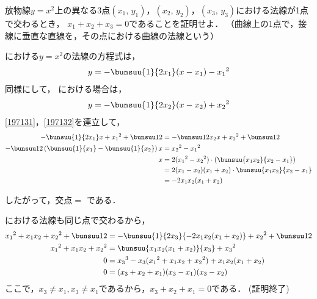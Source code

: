 \begin{problem}
  放物線$y=x^2$上の異なる3点$(x_1, \, y_1)$，$(x_2, \, y_2)$，$(x_3, \, y_3)$における法線が1点で交わるとき，
$x_1+x_2+x_3=0$であることを証明せよ．
（曲線上の1点で，接線に垂直な直線を，その点における曲線の法線という）
\end{problem}

 における$y=x^2$の法線の方程式は，
\begin{align}
  y = -\bunsuu{1}{2x_1}(x-x_1) - {x_1}^2 \label{197131}
\end{align}
同様にして， における場合は，
\begin{align}
  y = -\bunsuu{1}{2x_2}(x-x_2) + {x_2}^2 \label{197132}
\end{align}
\eqref{197131}，\eqref{197132}を連立して，
\begin{align*}
  -\bunsuu{1}{2x_1}x + {x_1}^2 + \bunsuu12 &= -\bunsuu1{2x_2}x + {x_2}^2 + \bunsuu12\\
  -\bunsuu12\left(\bunsuu{1}{x_1} - \bunsuu{1}{x_2}\right)x &= {x_2}^2 - {x_1}^2\\
  x&=2({x_1}^2-{x_2}^2) \cdot \left(\bunsuu{x_1x_2}{x_2-x_1}\right)\\
  &=2(x_1-x_2)(x_1 + x_2) \cdot \bunsuu{x_1x_2}{x_2-x_1}\\
  &=-2x_1x_2(x_1+x_2)
\end{align*}

したがって，交点$=$
である．

 における法線も同じ点で交わるから，
\begin{align*}
  {x_1}^2 + x_1x_2 + {x_2}^2 + \bunsuu12 &= -\bunsuu{1}{2x_3}\{-2x_1x_2(x_1+x_2)\} + {x_2}^2 + \bunsuu12 \\
  {x_1}^2 + x_1x_2 + {x_2}^2 &= \bunsuu{x_1x_2(x_1+x_2)}{x_3} + {x_3}^2\\
  0 &= {x_3}^3 - x_3({x_1}^2 + x_1x_2 + {x_2}^2) + x_1x_2(x_1+x_2) \\
  0 &= (x_3+x_2+x_1)(x_3-x_1)(x_3-x_2)
\end{align*}
ここで，$x_3 \neq x_1, x_3 \neq x_1$であるから，$x_3 + x_2 + x_1 = 0$である．
\hfill
(証明終了)
